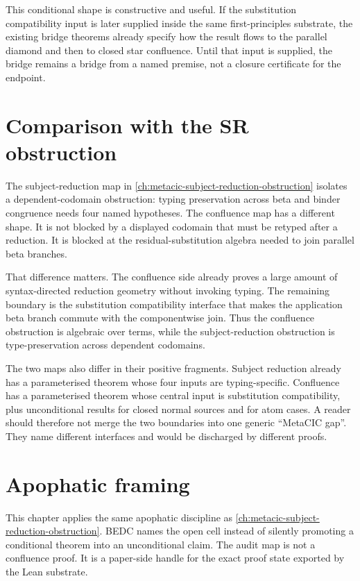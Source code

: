This conditional shape is constructive and useful. If the substitution
compatibility input is later supplied inside the same first-principles
substrate, the existing bridge theorems already specify how the result flows
to the parallel diamond and then to closed star confluence. Until that input is
supplied, the bridge remains a bridge from a named premise, not a closure
certificate for the endpoint.

\section{Comparison with the SR obstruction}
\label{sec:metacic-confluence-audit-map-sr-comparison}

The subject-reduction map in
\autoref{ch:metacic-subject-reduction-obstruction} isolates a
dependent-codomain obstruction: typing preservation across beta and binder
congruence needs four named hypotheses. The confluence map has a different
shape. It is not blocked by a displayed codomain that must be retyped after a
reduction. It is blocked at the residual-substitution algebra needed to join
parallel beta branches.

That difference matters. The confluence side already proves a large amount of
syntax-directed reduction geometry without invoking typing. The remaining
boundary is the substitution compatibility interface that makes the
application beta branch commute with the componentwise join. Thus the
confluence obstruction is algebraic over terms, while the subject-reduction
obstruction is type-preservation across dependent codomains.

The two maps also differ in their positive fragments. Subject reduction already
has a parameterised theorem whose four inputs are typing-specific. Confluence
has a parameterised theorem whose central input is substitution compatibility,
plus unconditional results for closed normal sources and for atom cases. A
reader should therefore not merge the two boundaries into one generic
``MetaCIC gap''. They name different interfaces and would be discharged by
different proofs.

\section{Apophatic framing}
\label{sec:metacic-confluence-audit-map-apophatic}

This chapter applies the same apophatic discipline as
\autoref{ch:metacic-subject-reduction-obstruction}. BEDC names the open cell
instead of silently promoting a conditional theorem into an unconditional
claim. The audit map is not a confluence proof. It is a paper-side handle for
the exact proof state exported by the Lean substrate.

